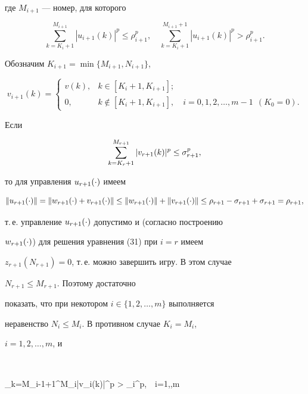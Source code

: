 где $M_{i+1}$ --- номер, для которого


$$


\sum\limits_{k=K_i+1}^{M_{i+1}} |u_{i+1}(k)|^p \leq \rho_{i+1}^p,


\quad


\sum\limits_{k=K_i+1}^{M_{i+1}+1} |u_{i+1}(k)|^p > \rho_{i+1}^p.


$$


Обозначим $K_{i+1} = \min\{M_{i+1}, N_{i+1} \}$,


$$


v_{i+1}(k) =


\begin{cases}


v(k), & k \in [K_i+1, K_{i+1}]; \\


0, & k \notin [K_i+1, K_{i+1}],


\quad i = 0,1,2, \dotsc, m-1\ \ (K_0 = 0).


\end{cases}


$$


Если


$$


\sum\limits_{k=K_r+1}^{M_{r+1}}|v_{r+1}(k)|^p \leq \s_{r+1}^p,


$$


то для управления $u_{r+1}(\cdot)$ имеем


$$


\|u_{r+1}(\cc)\| = \|w_{r+1}(\cc) + v_{r+1}(\cc)\|


\leq \|w_{r+1}(\cc)\| + \|v_{r+1}(\cc)\| \leq


\rho_{r+1} - \s_{r+1} + \s_{r+1} = \rho_{r+1},


$$


т.\,е. управление $u_{r+1}(\cdot)$ допустимо и (согласно построению


$w_{r+1}(\cdot)$) для решения уравнения (31) при $i=r$ имеем


$z_{r+1}(N_{r+1}) = 0$, т.\,е. можно завершить игру. В этом случае


$N_{r+1} \leq M_{r+1}$. Поэтому достаточно


показать, что при некотором $i \in \{1,2,\dotsc,m \}$ выполняется


неравенство $N_i \leq M_i$. В противном случае $K_i = M_i$,


$i = 1,2,\dotsc,m$, и


$$


\sum\limits_{k=M_{i-1}+1}^{M_i}|v_i(k)|^p > \s_i^p,\ \  i=1,\dotsc,m


